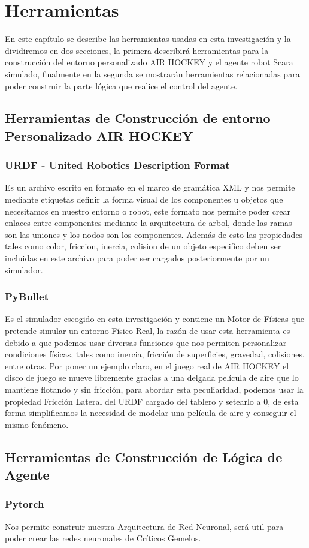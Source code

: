 \chapter{Herramientas}
En este capítulo se describe las herramientas usadas en esta investigación y la dividiremos en dos secciones, la primera describirá herramientas para la construcción del entorno personalizado AIR HOCKEY y el agente robot Scara simulado, finalmente en la segunda se mostrarán herramientas relacionadas para poder construir la parte lógica que realice el control del agente.

\section{Herramientas de Construcción de entorno Personalizado AIR HOCKEY}
     \subsection{URDF - United Robotics Description Format}
     Es un archivo escrito en formato en el marco de gramática XML y nos permite mediante etiquetas definir la forma visual de los componentes u objetos que necesitamos en nuestro entorno o robot, este formato nos permite poder crear enlaces entre componentes mediante la arquitectura de arbol, donde las ramas son las uniones y los nodos son los componentes. Además de esto las propiedades tales como color, friccion, inercia, colision de un objeto especifico deben ser incluidas en este archivo para poder ser cargados posteriormente por un simulador.
    \subsection{PyBullet}
    Es el simulador escogido en esta investigación y contiene un Motor de Físicas que pretende simular un entorno Físico Real, la razón de usar esta herramienta es debido a que podemos usar diversas funciones que nos permiten personalizar condiciones físicas, tales como inercia, fricción de superficies, gravedad, colisiones, entre otras. Por poner un ejemplo claro, en el juego real de AIR HOCKEY el disco de juego se mueve libremente gracias a una delgada película de aire que lo mantiene flotando y sin fricción, para abordar esta peculiaridad, podemos usar la propiedad Fricción Lateral del URDF cargado del tablero y setearlo a 0, de esta forma simplificamos la necesidad de modelar una película de aire y conseguir el mismo fenómeno.
   
\section{Herramientas de Construcción de Lógica de Agente}
    \subsection{Pytorch}
    Nos permite construir nuestra Arquitectura de Red Neuronal, será util para poder crear las redes neuronales de Críticos Gemelos.


